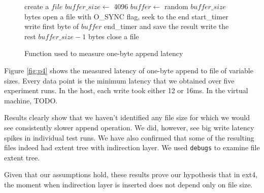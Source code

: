 \begin{figure}
\begin{algorithmic}
\STATE create a $file$
\STATE $buffer\_size \leftarrow$ 4096
\STATE $buffer \leftarrow$ random $buffer\_size$ bytes
\STATE open a file with O\_SYNC flag, seek to the end
\STATE start\_timer
\STATE write first byte of $buffer$
\STATE end\_timer and save the result
\STATE write the rest $buffer\_size - 1$ bytes
\STATE close a file
\ENDFOR
\end{algorithmic}
\caption{Function used to measure one-byte append latency}
\label{fig:p4pseudo}
\end{figure}

Figure \ref{fig:p4} shows the measured latency of one-byte append to file of variable sizes. Every data point is the minimum latency that we obtained over five experiment runs. In the host, each write took either 12 or 16ms. In the virtual machine, TODO. 

Results clearly show that we haven't identified any file size for which we would see consistently slower append operation. We did, however, see big write latency spikes in individual test runs. We have also confirmed that some of the resulting files indeed had extent tree with indirection layer. We used \texttt{debugs} to examine file extent tree.

Given that our assumptions hold, these results prove our hypothesis that in ext4, the moment when indirection layer is inserted does not depend only on file size.

